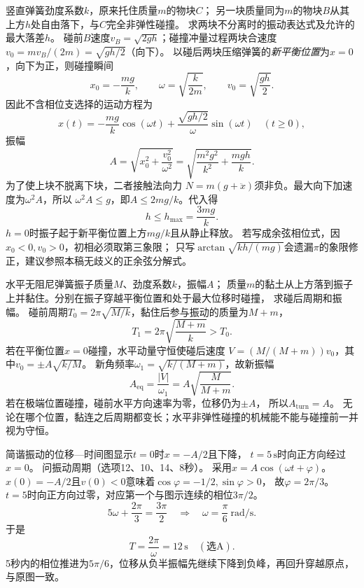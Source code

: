 
\problemtext 竖直弹簧劲度系数$k$，原来托住质量$m$的物块$C$；
另一块质量同为$m$的物块$B$从其上方$h$处自由落下，与$C$完全非弹性碰撞。
求两块不分离时的振动表达式及允许的最大落差$h$。
\workings
碰前$B$速度$v_B=\sqrt{2gh}$；碰撞冲量过程两块合速度
$v_0=mv_B/(2m)=\sqrt{gh/2}$（向下）。
以碰后两块压缩弹簧的\emph{新平衡位置}为$x=0$，向下为正，则碰撞瞬间
\[
x_0=-\frac{mg}{k},\qquad
\omega=\sqrt{\frac{k}{2m}},\qquad v_0=\sqrt{\frac{gh}{2}}.
\]
因此不含相位支选择的运动方程为
\[
\boxed{x(t)=-\frac{mg}{k}\cos(\omega t)
       +\frac{\sqrt{gh/2}}{\omega}\sin(\omega t)}
\quad(t\ge0),
\]
振幅
\[
\boxed{A=\sqrt{x_0^2+\frac{v_0^2}{\omega^2}}
=\sqrt{\frac{m^2g^2}{k^2}+\frac{mgh}{k}}}.
\]
为了使上块不脱离下块，二者接触法向力
$N=m(g+\ddot x)$须非负。最大向下加速度为$\omega^2A$，所以
$\omega^2A\le g$，即$A\le2mg/k$。代入得
\[
\boxed{h\le h_{\max}=\frac{3mg}{k}}.
\]
\crosscheck $h=0$时振子起于新平衡位置上方$mg/k$且从静止释放。
若写成余弦相位式，因$x_0<0,v_0>0$，初相必须取第三象限；
只写$\arctan\sqrt{kh/(mg)}$会遗漏$\pi$的象限修正，建议参照本稿无歧义的正余弦分解式。

\problemtext 水平无阻尼弹簧振子质量$M$、劲度系数$k$，振幅$A$；
质量$m$的黏土从上方落到振子上并黏住。分别在振子穿越平衡位置和处于最大位移时碰撞，
求碰后周期和振幅。
\workings
碰前周期$T_0=2\pi\sqrt{M/k}$，黏住后参与振动的质量为$M+m$，
\[
\boxed{T_1=2\pi\sqrt{\frac{M+m}{k}}>T_0}.
\]
若在平衡位置$x=0$碰撞，水平动量守恒使碰后速度
$V=(M/(M+m))v_0$，其中$v_0=\pm A\sqrt{k/M}$。
新角频率$\omega_1=\sqrt{k/(M+m)}$，故新振幅
\[
\boxed{A_{\mathrm{eq}}=\frac{|V|}{\omega_1}
=A\sqrt{\frac{M}{M+m}}}.
\]
若在极端位置碰撞，碰前水平方向速率为零，位移仍为$\pm A$，
所以$\boxed{A_{\mathrm{turn}}=A}$。
\crosscheck 无论在哪个位置，黏连之后周期都变长；水平非弹性碰撞的机械能不能与碰撞前一并视为守恒。

\problemtext 简谐振动的位移—时间图显示$t=0$时$x=-A/2$且下降，
$t=5\,\mathrm s$时向正方向经过$x=0$。
问振动周期（选项12、10、14、8秒）。
\workings
采用$x=A\cos(\omega t+\varphi)$。
$x(0)=-A/2$且$v(0)<0$意味着$\cos\varphi=-1/2,\sin\varphi>0$，
故$\varphi=2\pi/3$。
$t=5$时向正方向过零，对应第一个与图示连续的相位$3\pi/2$。
\[
5\omega+\frac{2\pi}{3}=\frac{3\pi}{2}
\quad\Longrightarrow\quad
\omega=\frac{\pi}{6}\ \mathrm{rad/s}.
\]
于是
\[
\boxed{T=\frac{2\pi}{\omega}=12\,\mathrm s}\quad(\text{选A}).
\]
\crosscheck 5秒内的相位推进为$5\pi/6$，位移从负半振幅先继续下降到负峰，再回升穿越原点，与原图一致。

